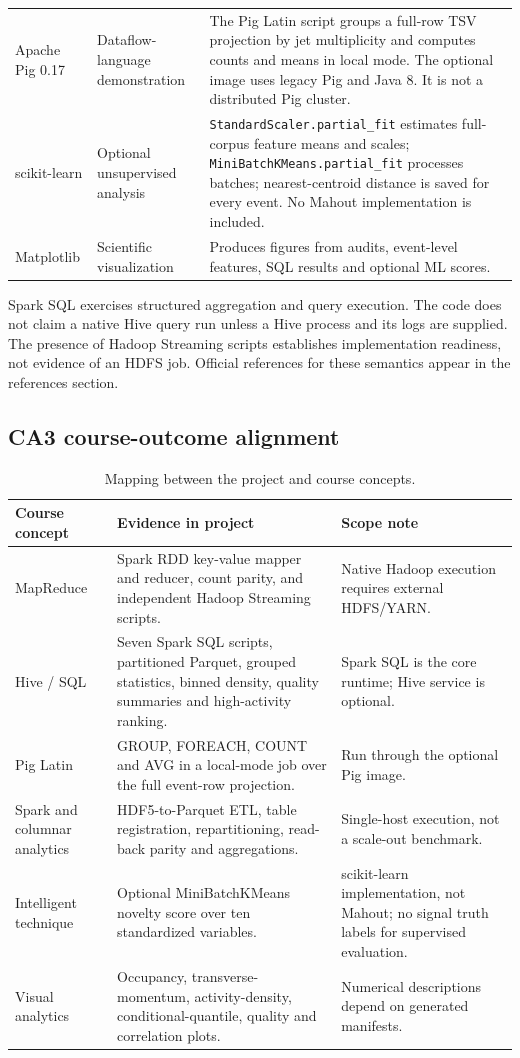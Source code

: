 \documentclass[11pt,a4paper]{article}
\begin{document}
\begin{longtable}{>{\raggedright\arraybackslash}p{2.45cm} >{\raggedright\arraybackslash}p{2.35cm} >{\raggedright\arraybackslash}p{8.45cm}}
Apache Pig 0.17 & Dataflow-language demonstration & The Pig Latin script groups a full-row TSV projection by jet multiplicity and computes counts and means in local mode. The optional image uses legacy Pig and Java 8. It is not a distributed Pig cluster. \\
scikit-learn & Optional unsupervised analysis & \texttt{StandardScaler.partial\_fit} estimates full-corpus feature means and scales; \texttt{MiniBatchKMeans.partial\_fit} processes batches; nearest-centroid distance is saved for every event. No Mahout implementation is included. \\
Matplotlib & Scientific visualization & Produces figures from audits, event-level features, SQL results and optional ML scores. \\
\bottomrule\end{longtable}

Spark SQL exercises structured aggregation and query execution. The code does not claim a native Hive query run unless a Hive process and its logs are supplied. The presence of Hadoop Streaming scripts establishes implementation readiness, not evidence of an HDFS job. Official references for these semantics appear in the references section.

\subsection{CA3 course-outcome alignment}
\begin{table}[H]\centering
\caption{Mapping between the project and course concepts.}
\begin{tabularx}{\textwidth}{p{2.35cm} X X}\toprule
Course concept & Evidence in project & Scope note \\\midrule
MapReduce & Spark RDD key-value mapper and reducer, count parity, and independent Hadoop Streaming scripts. & Native Hadoop execution requires external HDFS/YARN. \\
Hive / SQL & Seven Spark SQL scripts, partitioned Parquet, grouped statistics, binned density, quality summaries and high-activity ranking. & Spark SQL is the core runtime; Hive service is optional. \\
Pig Latin & GROUP, FOREACH, COUNT and AVG in a local-mode job over the full event-row projection. & Run through the optional Pig image. \\
Spark and columnar analytics & HDF5-to-Parquet ETL, table registration, repartitioning, read-back parity and aggregations. & Single-host execution, not a scale-out benchmark. \\
Intelligent technique & Optional MiniBatchKMeans novelty score over ten standardized variables. & scikit-learn implementation, not Mahout; no signal truth labels for supervised evaluation. \\
Visual analytics & Occupancy, transverse-momentum, activity-density, conditional-quantile, quality and correlation plots. & Numerical descriptions depend on generated manifests. \\\bottomrule
\end{tabularx}\end{table}
\end{document}

